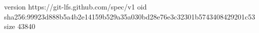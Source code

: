version https://git-lfs.github.com/spec/v1
oid sha256:99923d888b5a4b2e14159b529a35a030bd28e76e3c32301b5743408429201c53
size 43840
